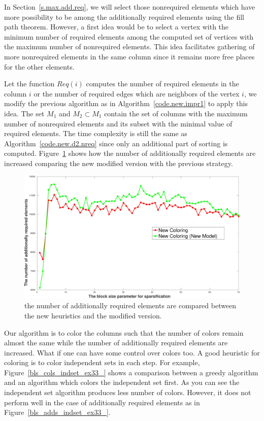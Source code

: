\documentclass[12pt, twoside,a4paper,toc=bibliography]{scrbook}
\newcommand{\figref}[1]{Figure~\protect\ref{#1}}
\newcommand{\secref}[1]{Section~\protect\ref{#1}}
\newcommand{\coderef}[1]{Algorithm~\protect\ref{#1}}
\begin{document}
In \secref{s.max.add.req}, we will select those nonrequired elements which have more possibility
to be among the additionally required elements using the fill path theorem.
However, a first idea would be to select a vertex with the minimum number of required elements
among the computed set of vertices with the maximum number of nonrequired elements.
This idea facilitates gathering of more nonrequired elements in the same column since
it remains more free places for the other elements.

Let the function $Req(i)$ computes the number of required elements in the column $i$ or the
number of required edges which are neighbors of the vertex $i$,
we modify the previous algorithm as in \coderef{code.new.impr1} to
apply this idea. The set $M_1$ and $M_2\subset M_1$ contain the set of columns with the maximum
number of nonrequired elements and its subset with the minimal value of required elements.
The time complexity is still the same as \coderef{code.new.d2.nreq}
since only an additional part of sorting is computed.
\figref{bls_add_ex33_compare_max} shows how the number of additionally
required elements are increased comparing the new modified version with the previous strategy.
\begin{figure}
\centering
\includegraphics[width=0.9\linewidth]{bls_add_ex33_compare_max}
\caption{the number of additionally required elements are compared between the new heuristics
and the modified version.}
\label{bls_add_ex33_compare_max}
\end{figure}

Our algorithm is to color the columns such that the number of colors
remain almost the same while the number of additionally required elements are increased.
What if one can have some control over colors too.
A good heuristic for coloring is to color independent sets in each step.
For example, \figref{bls_cols_indset_ex33_} shows a comparison between a greedy algorithm and
an algorithm which colors the independent set first. As you can see the independent set algorithm
produces less number of colors. However, it does not perform well in the case of additionally
required elements as in \figref{bls_adds_indset_ex33_}.
\end{document}
